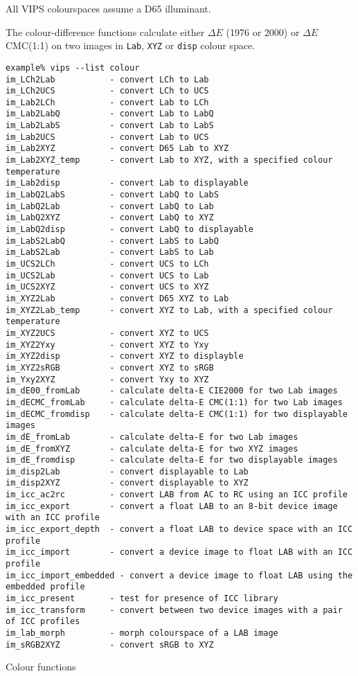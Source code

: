 All VIPS colourspaces assume a D65 illuminant.

The colour-difference functions calculate either $\Delta{}E$ \cielab{} (1976
or 2000) or $\Delta{}E$ CMC(1:1) on two images in \verb+Lab+, \verb+XYZ+ 
or \verb+disp+ colour space.

\begin{fig2}
\begin{verbatim}
example% vips --list colour
im_LCh2Lab           - convert LCh to Lab
im_LCh2UCS           - convert LCh to UCS
im_Lab2LCh           - convert Lab to LCh
im_Lab2LabQ          - convert Lab to LabQ
im_Lab2LabS          - convert Lab to LabS
im_Lab2UCS           - convert Lab to UCS
im_Lab2XYZ           - convert D65 Lab to XYZ
im_Lab2XYZ_temp      - convert Lab to XYZ, with a specified colour temperature
im_Lab2disp          - convert Lab to displayable
im_LabQ2LabS         - convert LabQ to LabS
im_LabQ2Lab          - convert LabQ to Lab
im_LabQ2XYZ          - convert LabQ to XYZ
im_LabQ2disp         - convert LabQ to displayable
im_LabS2LabQ         - convert LabS to LabQ
im_LabS2Lab          - convert LabS to Lab
im_UCS2LCh           - convert UCS to LCh
im_UCS2Lab           - convert UCS to Lab
im_UCS2XYZ           - convert UCS to XYZ
im_XYZ2Lab           - convert D65 XYZ to Lab
im_XYZ2Lab_temp      - convert XYZ to Lab, with a specified colour temperature
im_XYZ2UCS           - convert XYZ to UCS
im_XYZ2Yxy           - convert XYZ to Yxy
im_XYZ2disp          - convert XYZ to displayble
im_XYZ2sRGB          - convert XYZ to sRGB
im_Yxy2XYZ           - convert Yxy to XYZ
im_dE00_fromLab      - calculate delta-E CIE2000 for two Lab images
im_dECMC_fromLab     - calculate delta-E CMC(1:1) for two Lab images
im_dECMC_fromdisp    - calculate delta-E CMC(1:1) for two displayable images
im_dE_fromLab        - calculate delta-E for two Lab images
im_dE_fromXYZ        - calculate delta-E for two XYZ images
im_dE_fromdisp       - calculate delta-E for two displayable images
im_disp2Lab          - convert displayable to Lab
im_disp2XYZ          - convert displayable to XYZ
im_icc_ac2rc         - convert LAB from AC to RC using an ICC profile
im_icc_export        - convert a float LAB to an 8-bit device image with an ICC profile
im_icc_export_depth  - convert a float LAB to device space with an ICC profile
im_icc_import        - convert a device image to float LAB with an ICC profile
im_icc_import_embedded - convert a device image to float LAB using the embedded profile
im_icc_present       - test for presence of ICC library
im_icc_transform     - convert between two device images with a pair of ICC profiles
im_lab_morph         - morph colourspace of a LAB image
im_sRGB2XYZ          - convert sRGB to XYZ
\end{verbatim}
\caption{Colour functions}
\label{fg:colour}
\end{fig2}

